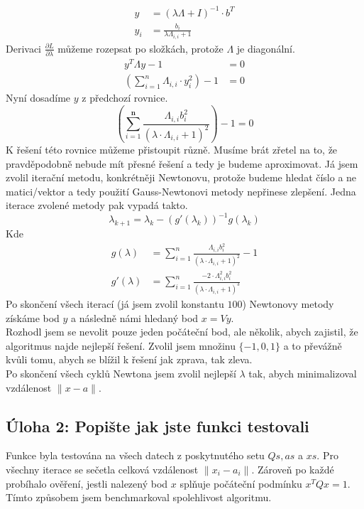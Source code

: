 \documentclass[12pt]{article}
\begin{document}
	\begin{align*}
		y &= (\lambda\Lambda + I)^{-1} \cdot b^{T} \\
		y_i &= \frac{b_i}{\lambda\Lambda_{i,i} + 1}
	\end{align*}
	Derivaci $\frac{\partial L}{\partial \lambda}$ můžeme rozepsat po složkách, 
	protože $\Lambda$ je diagonální.
	\begin{align*}
		y^T\Lambda y - 1&= 0 \\
		(\sum_{i=1}^n \Lambda_{i,i}\cdot y_{i}^2) - 1 &= 0
	\end{align*}
	Nyní dosadíme $y$ z předchozí rovnice.
	\begin{equation*}
		(\sum_{i=1}^{\bm{n}} \frac{\Lambda_{i,i}b_{i}^2}{(\lambda\cdot\Lambda_{i,i} + 1)^2}) 
		- 1 = 0
	\end{equation*}
	K řešení této rovnice můžeme přistoupit různě. Musíme brát zřetel na to, že 
	pravděpodobně nebude mít přesné řešení a tedy je budeme aproximovat. 
	Já jsem zvolil iterační metodu, konkrétněji Newtonovu, protože budeme hledat 
	číslo a ne matici/vektor a tedy použití Gauss-Newtonovi metody nepřinese 
	zlepšení.
	Jedna iterace zvolené metody pak vypadá takto.
	\begin{equation*}
		\lambda_{k+1} = \lambda_k - (g'(\lambda_k ))^{-1}g(\lambda_k) 
	\end{equation*}
	Kde
	\begin{align*}
		g(\lambda) &= \sum_{i=1}^{n} \frac{\Lambda_{i,i}b_{i}^2}
		{(\lambda\cdot\Lambda_{i,i} + 1)^2} - 1 \\
		g'(\lambda) &= \sum_{i=1}^{n} \frac{-2\cdot\Lambda_{i,i}^2b_{i}^2}
		{(\lambda\cdot\Lambda_{i,i} + 1)^3}
	\end{align*}
	Po skončení všech iterací (já jsem zvolil konstantu $100$) Newtonovy metody 
	získáme bod $y$ a následně námi hledaný bod $x = Vy$. \\
	Rozhodl jsem se nevolit pouze jeden počáteční bod, ale několik, abych zajistil,
	že algoritmus najde nejlepší řešení. Zvolil jsem množinu $\{-1,0,1\}$ a to 
	převážně kvůli tomu, abych se blížil k řešení jak zprava, tak zleva. \\
	Po skončení všech cyklů Newtona jsem zvolil nejlepší $\lambda$ tak, abych
	minimalizoval vzdálenost $\|x-a\|$.
	\subsection*{Úloha 2: Popište jak jste funkci testovali}
	Funkce byla testována na všech datech z poskytnutého setu $Qs, as$ a 
	$xs$. Pro všechny iterace se sečetla celková vzdálenost $\|x_i-a_i\|$.
	Zároveň po každé probíhalo ověření, jestli nalezený bod $x$ splňuje 
	počáteční podmínku $x^{T}Qx = 1$. Tímto způsobem jsem benchmarkoval 
	spolehlivost algoritmu.
\end{document}
